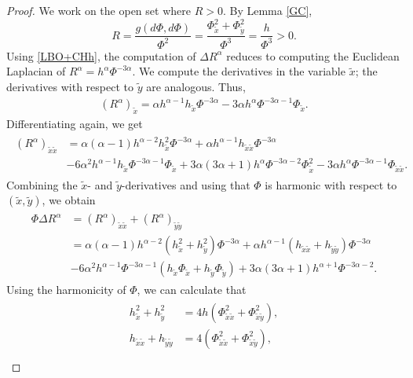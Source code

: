 \documentclass[11pt,reqno]{amsart}
\theoremstyle{plain}
\theoremstyle{definition}
\numberwithin{equation}{section}
\begin{document}
\begin{proof}
We work on the open set where $R>0$. By Lemma \ref{GC}, 
$$R=\frac{g(d\Phi,d\Phi)}{\Phi^2}=\frac{\Phi_{\tilde{x}}^2+\Phi_{\tilde{y}}^2}{\Phi^3}=\frac{h}{\Phi^3}>0.$$
Using \eqref{LBO+CHh}, the computation of $\Delta R^{\alpha}$ reduces to computing the Euclidean Laplacian of $R^\alpha=h^{\alpha}\Phi^{-3\alpha}$. We compute the derivatives in the variable $\tilde{x}$; the derivatives with respect to $\tilde{y}$ are analogous. Thus,
$$\begin{array}{ccl}
 (R^{\alpha})_{\tilde{x}}  =\alpha h^{\alpha-1}h_{\tilde{x}}\Phi^{-3\alpha}-3\alpha h^{\alpha}\Phi^{-3\alpha-1}\Phi_{\tilde{x}}.
\end{array}$$
Differentiating again, we get
\begin{align*}\begin{split}
 (R^{\alpha})_{\tilde{x}\tilde{x}} &= \alpha(\alpha-1)h^{\alpha-2}h_{\tilde{x}}^2\Phi^{-3\alpha}+\alpha h^{\alpha-1}h_{\tilde{x}\tilde{x}}\Phi^{-3\alpha}\\
     &-6\alpha^2 h^{\alpha-1}h_{\tilde{x}}\Phi^{-3\alpha-1}\Phi_{\tilde{x}} +3\alpha(3\alpha+1)h^{\alpha}\Phi^{-3\alpha-2}\Phi_{\tilde{x}}^2-3\alpha h^{\alpha}\Phi^{-3\alpha-1}\Phi_{\tilde{x}\tilde{x}}.    
\end{split}\end{align*}
Combining the $\tilde{x}$- and $\tilde{y}$-derivatives and using that $\Phi$ is harmonic with respect to $(\tilde{x},\tilde{y})$, we obtain
\begin{align*}\begin{split}
  \Phi\Delta R^{\alpha}  & =  \displaystyle (R^{\alpha})_{\tilde{x}\tilde{x}} + (R^{\alpha})_{\tilde{y}\tilde{y}} \\
    & =  \displaystyle \alpha(\alpha-1)h^{\alpha-2}(h_{\tilde{x}}^2+h_{\tilde{y}}^2)\Phi^{-3\alpha}+\alpha h^{\alpha-1}(h_{\tilde{x}\tilde{x}}+h_{\tilde{y}\tilde{y}})\Phi^{-3\alpha} \\
      &  \displaystyle -6\alpha^2 h^{\alpha-1}\Phi^{-3\alpha-1}(h_{\tilde{x}}\Phi_{\tilde{x}}+h_{\tilde{y}}\Phi_{\tilde{y}})+3\alpha(3\alpha+1)h^{\alpha+1}\Phi^{-3\alpha-2}.
\end{split}\end{align*}
Using the harmonicity of $\Phi$, we can calculate that
\begin{align*}\begin{split}
   h_{\tilde{x}}^2+h_{\tilde{y}}^2  & =   4h(\Phi_{\tilde{x}\tilde{x}}^2+\Phi_{\tilde{x}\tilde{y}}^2),\\
    h_{\tilde{x}\tilde{x}}+h_{\tilde{y}\tilde{y}} & =  4(\Phi_{\tilde{x}\tilde{x}}^2+\Phi_{\tilde{x}\tilde{y}}^2), \\

\end{split}
\end{align*}
\end{proof}
\end{document}
